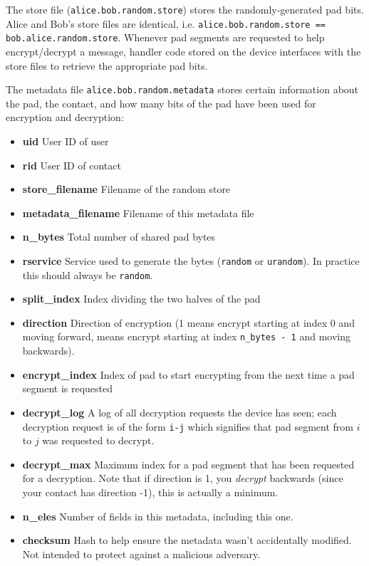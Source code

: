 \documentclass[twocolumn]{article}
\begin{document}
The store file (\texttt{alice.bob.random.store}) stores the randomly-generated pad bits. Alice and Bob's store files are identical, i.e.
\texttt{alice.bob.random.store == bob.alice.random.store}. Whenever pad segments are requested to help encrypt/decrypt a message, handler code stored on the device interfaces with the store files to retrieve the appropriate pad bits.

The metadata file \texttt{alice.bob.random.metadata} stores certain information about the pad, the contact, and how many bits of the pad have been used for encryption and decryption:

\begin{itemize} \itemsep0em 
  \item[] \textbf{uid} User ID of user
  \item[] \textbf{rid} User ID of contact
  \item[] \textbf{store\_filename} Filename of the random store
  \item[] \textbf{metadata\_filename} Filename of this metadata file
  \item[] \textbf{n\_bytes} Total number of shared pad bytes
  \item[] \textbf{rservice} Service used to generate the bytes (\texttt{random} or \texttt{urandom}). In practice this should always be \texttt{random}.
  \item[] \textbf{split\_index} Index dividing the two halves of the pad
  \item[] \textbf{direction} Direction of encryption (1 means encrypt starting at index 0 and moving forward, means encrypt starting at index \texttt{n\_bytes - 1} and moving backwards).
  \item[] \textbf{encrypt\_index} Index of pad to start encrypting from the next time a pad segment is requested
  \item[] \textbf{decrypt\_log} A log of all decryption requests the device has seen; each decryption request is of the form \texttt{i-j} which signifies that pad segment from $i$ to $j$ was requested to decrypt.
  \item[] \textbf{decrypt\_max} Maximum index for a pad segment that has been requested for a decryption. Note that if direction is 1, you \emph{decrypt} backwards (since your contact has direction -1), this is actually a minimum.
  \item[] \textbf{n\_eles} Number of fields in this metadata, including this one.
  \item[] \textbf{checksum} Hash to help ensure the metadata wasn't accidentally modified. Not intended to protect against a malicious adversary.
\end{itemize}
\end{document}
